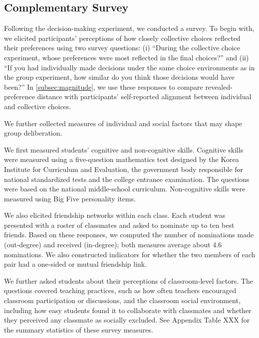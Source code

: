 \documentclass[11 pt]{article}
\begin{document}

\subsection{Complementary Survey}
\label{subsec:complementary_survey}

Following the decision-making experiment, we conducted a survey. To begin with, we elicited participants' perceptions of how closely collective choices reflected their preferences using two survey questions: (i) ``During the collective choice experiment, whose preferences were most reflected in the final choices?'' and (ii) ``If you had individually made decisions under the same choice environments as in the group experiment, how similar do you think those decisions would have been?'' In \autoref{subsec:magnitude}, we use these responses to compare revealed-preference distance with participants' self-reported alignment between individual and collective choices.

We further collected measures of individual and social factors that may shape group deliberation.

We first measured students' cognitive and non-cognitive skills. Cognitive skills were measured using a five-question mathematics test designed by the Korea Institute for Curriculum and Evaluation, the government body responsible for national standardized tests and the college entrance examination. The questions were based on the national middle-school curriculum. %
Non-cognitive skills were measured using Big Five personality items.

We also elicited friendship networks within each class. Each student was presented with a roster of classmates and asked to nominate up to ten best friends. Based on these responses, we computed the number of nominations made (out-degree) and received (in-degree); both measures average about 4.6 nominations. We also constructed indicators for whether the two members of each pair had a one-sided or mutual friendship link.%

We further asked students about their perceptions of classroom-level factors. The questions covered teaching practices, such as how often teachers encouraged classroom participation or discussions, and the classroom social environment, including how easy students found it to collaborate with classmates and whether they perceived any classmate as socially excluded. See  Appendix Table XXX for the summary statistics of these survey measures.
\end{document}
